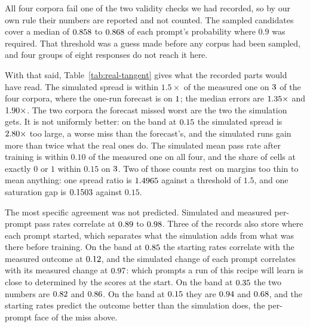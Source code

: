 All four corpora fail one of the two validity checks we had recorded, so by our own rule their
numbers are reported and not counted. The sampled candidates cover a median of
$0.858$ to $0.868$ of each prompt's probability where
$0.9$ was required. That threshold was a guess made before any corpus had been sampled, and four
groups of eight responses do not reach it here.

With that said, Table~\ref{tab:real-tangent} gives what the recorded parts would have read. The
simulated spread is within $1.5\times$ of the measured one on $3$ of the four
corpora, where the one-run forecast is on $1$; the median errors are
$1.35\times$ and $1.90\times$. The two corpora
the forecast missed worst are the two the simulation gets. It is not uniformly better: on the band
at $0.15$ the simulated spread is $2.80\times$ too
large, a worse miss than the forecast's, and the simulated runs gain more than twice what the real
ones do. The simulated mean pass rate after training is within $0.10$ of the measured one on all
four, and the share of cells at exactly $0$ or $1$ within $0.15$ on $3$.
Two of those counts rest on margins too thin to mean anything: one spread ratio is
$1.4965$ against a threshold of $1.5$, and one saturation gap is
$0.1503$ against $0.15$.

The most specific agreement was not predicted. Simulated and measured per-prompt pass rates
correlate at $0.89$ to $0.98$. Three of the
records also store where each prompt started, which separates what the simulation adds from what
was there before training. On the band at $0.85$ the starting rates
correlate with the measured outcome at $0.12$, and the simulated change
of each prompt correlates with its measured change at $0.97$: which
prompts a run of this recipe will learn is close to determined by the scores at the start. On the
band at $0.35$ the two numbers are $0.82$ and
$0.86$. On the band at $0.15$ they are
$0.94$ and $0.68$, and the starting rates predict
the outcome better than the simulation does, the per-prompt face of the miss above.

